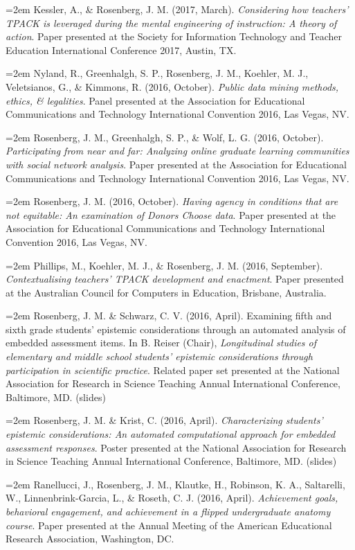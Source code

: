 \documentclass[14,]{article}
\begin{document}
\hangindent=2em Kessler, A., \& Rosenberg, J. M. (2017, March).
\emph{Considering how teachers' TPACK is leveraged during the mental
engineering of instruction: A theory of action}. Paper presented at the
Society for Information Technology and Teacher Education International
Conference 2017, Austin, TX.

\hangindent=2em Nyland, R., Greenhalgh, S. P., Rosenberg, J. M.,
Koehler, M. J., Veletsianos, G., \& Kimmons, R. (2016, October).
\emph{Public data mining methods, ethics, \& legalities}. Panel
presented at the Association for Educational Communications and
Technology International Convention 2016, Las Vegas, NV.

\hangindent=2em Rosenberg, J. M., Greenhalgh, S. P., \& Wolf, L. G.
(2016, October). \emph{Participating from near and far: Analyzing online
graduate learning communities with social network analysis}. Paper
presented at the Association for Educational Communications and
Technology International Convention 2016, Las Vegas, NV.

\hangindent=2em Rosenberg, J. M. (2016, October). \emph{Having agency in
conditions that are not equitable: An examination of Donors Choose
data}. Paper presented at the Association for Educational Communications
and Technology International Convention 2016, Las Vegas, NV.

\hangindent=2em Phillips, M., Koehler, M. J., \& Rosenberg, J. M. (2016,
September). \emph{Contextualising teachers' TPACK development and
enactment}. Paper presented at the Australian Council for Computers in
Education, Brisbane, Australia.

\hangindent=2em Rosenberg, J. M. \& Schwarz, C. V. (2016, April).
Examining fifth and sixth grade students' epistemic considerations
through an automated analysis of embedded assessment items. In B. Reiser
(Chair), \emph{Longitudinal studies of elementary and middle school
students' epistemic considerations through participation in scientific
practice}. Related paper set presented at the National Association for
Research in Science Teaching Annual International Conference, Baltimore,
MD. (slides)

\hangindent=2em Rosenberg, J. M. \& Krist, C. (2016, April).
\emph{Characterizing students' epistemic considerations: An automated
computational approach for embedded assessment responses}. Poster
presented at the National Association for Research in Science Teaching
Annual International Conference, Baltimore, MD. (slides)

\hangindent=2em Ranellucci, J., Rosenberg, J. M., Klautke, H., Robinson,
K. A., Saltarelli, W., Linnenbrink-Garcia, L., \& Roseth, C. J. (2016,
April). \emph{Achievement goals, behavioral engagement, and achievement
in a flipped undergraduate anatomy course}. Paper presented at the
Annual Meeting of the American Educational Research Association,
Washington, DC.
\end{document}
